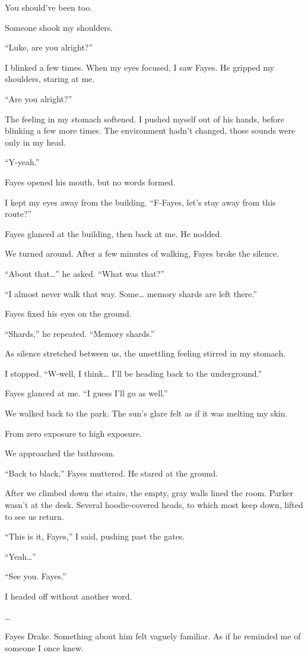 You should’ve been too.

Someone shook my shoulders.

“Luke, are you alright?”

I blinked a few times. When my eyes focused, I saw Fayes. He gripped my shoulders, staring at me. 

“Are you alright?”

The feeling in my stomach softened. I pushed myself out of his hands, before blinking a few more times. The environment hadn’t changed, those sounds were only in my head.

“Y-yeah.”

Fayes opened his mouth, but no words formed. 

I kept my eyes away from the building. “F-Fayes, let’s stay away from this route?”

Fayes glanced at the building, then back at me. He nodded.

We turned around. After a few minutes of walking, Fayes broke the silence.

“About that…” he asked. “What was that?”

“I almost never walk that way. Some… memory shards are left there.”

Fayes fixed his eyes on the ground. 

“Shards,” he repeated. “Memory shards.”

As silence stretched between us, the unsettling feeling stirred in my stomach.

I stopped. “W-well, I think… I’ll be heading back to the underground.”

Fayes glanced at me. “I guess I’ll go as well.”

We walked back to the park. The sun’s glare felt as if it was melting my skin. 

From zero exposure to high exposure.

We approached the bathroom.

“Back to black,” Fayes muttered. He stared at the ground.

After we climbed down the stairs, the empty, gray walls lined the room. Parker wasn’t at the desk. Several hoodie-covered heads, to which most keep down, lifted to see us return. 

“This is it, Fayes,” I said, pushing past the gates.

“Yeah…”

“See you. Fayes.”

I headed off without another word.

…

Fayes Drake. Something about him felt vaguely familiar. As if he reminded me of someone I once knew.

